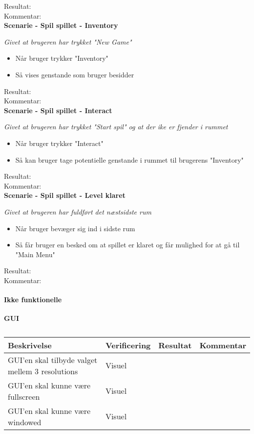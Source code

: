 Resultat:\\
Kommentar:\\

\bf{Scenarie - Spil spillet - Inventory}

\it{Givet at brugeren har trykket "New Game"}

\begin{itemize}
  \item Når bruger trykker "Inventory"
  \item Så vises genstande som bruger besidder
\end{itemize}

Resultat:\\
Kommentar:\\

\bf{Scenarie - Spil spillet - Interact}

\it{Givet at brugeren har trykket "Start spil" og at der ike er fjender i rummet}

\begin{itemize}
  \item Når bruger trykker "Interact"
  \item Så kan bruger tage potentielle genstande i rummet til brugerens "Inventory"
\end{itemize}

Resultat:\\
Kommentar:\\

\bf{Scenarie - Spil spillet - Level klaret}

\it{Givet at brugeren har fuldført det næstsidste rum}

\begin{itemize}
  \item Når bruger bevæger sig ind i sidste rum
  \item Så får bruger en besked om at spillet er klaret og får mulighed for at gå til "Main Menu"
\end{itemize}

Resultat:\\
Kommentar:\\

\paragraph{Ikke funktionelle}
\bf{GUI}\\
\begin{table}
\caption{}
\label{tab:}
\begin{tabular}{p{3cm}|p{3cm}|p{3cm}|p{3cm}}
Beskrivelse & Verificering & Resultat & Kommentar \\
\hline
GUI'en skal tilbyde valget mellem 3 resolutions & Visuel & & \\
\hline
GUI'en skal kunne være fullscreen & Visuel & &\\
\hline
GUI'en skal kunne være windowed & Visuel & & \\
\end{tabular}
\end{table}


